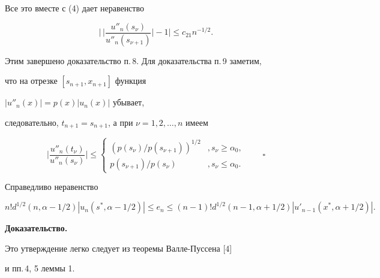 Все это вместе с (4) дает неравенство


$$


\bigg|\,\bigg|\frac{u''_n(s_\nu)}


{u''_n(s_{\nu+1})}\bigg|-1\bigg|


\leq c_{21}n^{-1/2}.


$$


Этим завершено доказательство п.\,8. Для доказательства п.\,9 заметим,


что на отрезке $[s_{n+1},x_{n+1}]$ функция 


$|u''_n(x)|=p(x)| u_n(x)|$ убывает, 


следовательно, $t_{n+1}=s_{n+1}$, а при $\nu=1,2,\dotsc, n$ имеем


$$


\bigg|\frac{u''_n(t_\nu)}


{u''_n(s_\nu)}\bigg|\leq


\begin{cases}


(p(s_\nu)/p(s_{\nu+1}))^{1/2}&, s_\nu\geq\alpha_0,\\


p(s_{\nu+1})/p(s_\nu)&, s_\nu\leq\alpha_0.


\end{cases}


\qquad\square


$$





\begin{lem}


Справедливо неравенство


\begin{equation}


n!d^{1/2}(n,\alpha-1/2)| u_n(s^\ast,\alpha-1/2)|


\leq e_n \leq


(n-1)!d^{1/2}(n-1,\alpha+1/2)|u'_{n-1}(x^\ast,\alpha+


1/2)|.


\end{equation}


\end{lem}





{\bf Доказательство.}


Это утверждение легко следует из теоремы Валле-Пуссена [4] 


и пп.\,4, 5 леммы 1.





